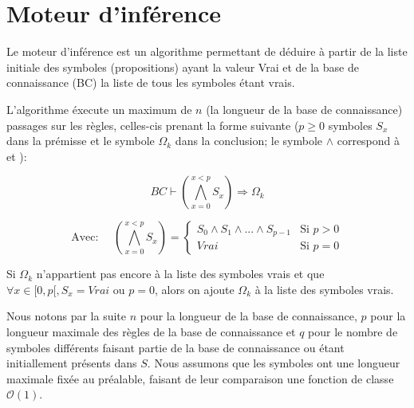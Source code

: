 \documentclass[12pt]{article}
\begin{document}
\newpage

\section{Moteur d'inférence}

Le moteur d'inférence est un algorithme permettant de déduire à partir de la liste initiale des symboles (propositions) ayant la valeur \og Vrai \fg et de la base de connaissance (BC) la liste de tous les symboles étant vrais.

L'algorithme éxecute un maximum de $n$ (la longueur de la base de connaissance) passages sur les règles, celles-cis prenant la forme suivante ($p \geq 0$ symboles $S_x$ dans la prémisse et le symbole $\Omega_k$ dans la conclusion; le symbole $\land$ correspond à \og et \fg):

\[BC \vdash (\bigwedge_{x=0}^{x < p} S_x) \Rightarrow \Omega_k\]

\[\text{Avec: } \quad (\bigwedge_{x=0}^{x < p} S_x) = \begin{cases}
  S_0 \land S_1 \land ... \land S_{p-1} & \text{Si } p > 0 \\
  Vrai & \text{Si } p = 0
\end{cases}
\]

Si $\Omega_k$ n'appartient pas encore à la liste des symboles vrais et que $\forall x \in [0, p[, S_x = Vrai$ ou $p = 0$, alors on ajoute $\Omega_k$ à la liste des symboles vrais.

Nous notons par la suite $n$ pour la longueur de la base de connaissance, $p$ pour la longueur maximale des règles de la base de connaissance et $q$ pour le nombre de symboles différents faisant partie de la base de connaissance ou étant initiallement présents dans $S$.
Nous assumons que les symboles ont une longueur maximale fixée au préalable, faisant de leur comparaison une fonction de classe $\mathcal{O}(1)$.
\end{document}
